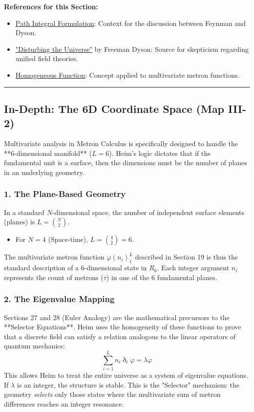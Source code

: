 \documentclass[11pt,a4paper,oneside]{article}
\newenvironment{sectionrefs}
  {\par\vspace{1em}\noindent\textbf{\textsf{References for this Section:}}\begin{itemize}[leftmargin=*, label={\scriptsize$\blacksquare$}, itemsep=2pt]}
  {\end{itemize}}
\newcommand{\hr}{\par\vspace{2em}\noindent\rule{\linewidth}{0.4pt}\par\vspace{2em}}
\begin{document}
\begin{sectionrefs}
    \item \href{https://en.wikipedia.org/wiki/Path_integral_formulation}{Path Integral Formulation}: Context for the discussion between Feynman and Dyson.
    \item \href{https://en.wikipedia.org/wiki/Freeman_Dyson}{"Disturbing the Universe"} by Freeman Dyson: Source for skepticism regarding unified field theories.
    \item \href{https://en.wikipedia.org/wiki/Homogeneous_function}{Homogeneous Function}: Concept applied to multivariate metron functions.
\end{sectionrefs}

\hr

\subsection*{In-Depth: The 6D Coordinate Space (Map III-2)}

Multivariate analysis in Metron Calculus is specifically designed to handle the **6-dimensional manifold** ($L=6$). Heim’s logic dictates that if the fundamental unit is a surface, then the dimensions must be the number of planes in an underlying geometry.

\subsubsection*{1. The Plane-Based Geometry}
In a standard $N$-dimensional space, the number of independent surface elements (planes) is $L = \binom{N}{2}$.
\begin{itemize}
    \item For $N=4$ (Space-time), $L = \binom{4}{2} = 6$.
\end{itemize}
The multivariate metron function $\varphi(n_i)_1^L$ described in Section 19 is thus the standard description of a 6-dimensional state in $R_6$. Each integer argument $n_i$ represents the count of metrons ($\tau$) in one of the 6 fundamental planes.

\subsubsection*{2. The Eigenvalue Mapping}
Sections 27 and 28 (Euler Analogy) are the mathematical precursors to the **Selector Equations**. Heim uses the homogeneity of these functions to prove that a discrete field can satisfy a relation analogous to the linear operators of quantum mechanics:
\begin{equation}
    \sum_{i=1}^L n_i \eth_i \varphi = \lambda \varphi
\end{equation}
This allows Heim to treat the entire universe as a system of eigenvalue equations. If $\lambda$ is an integer, the structure is stable. This is the "Selector" mechanism: the geometry \textit{selects} only those states where the multivariate sum of metron differences reaches an integer resonance.
\end{document}
